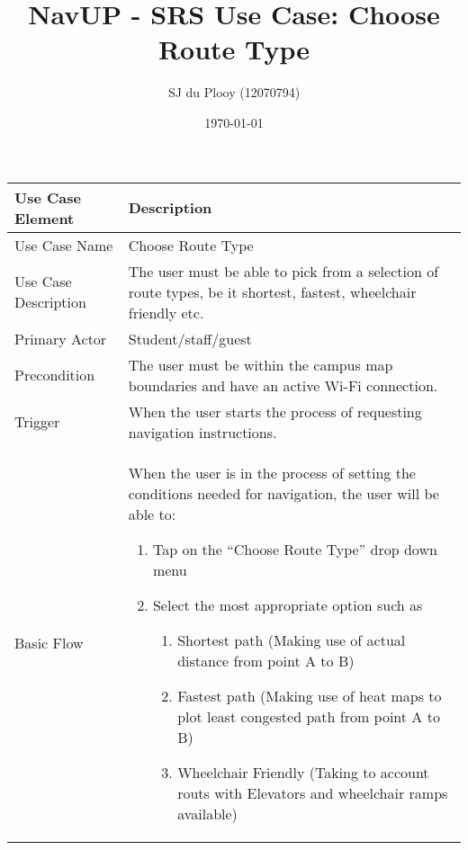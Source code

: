 \documentclass[12pt]{article}
\begin{document}
\title{NavUP - SRS Use Case: Choose Route Type}
\author{SJ du Plooy (12070794)}
\date{\today}
\maketitle


\begin{tabular}{|p{4cm}|p{10cm}|}
\hline

Use Case Element & Description \\
\hline

Use Case Name & 
Choose Route Type \\
\hline

Use Case Description & 
The user must be able to pick from a selection of route types, be it shortest, fastest, wheelchair friendly etc.   \\
\hline

Primary Actor & 
Student/staff/guest \\
\hline

Precondition & 
The user must be within the campus map boundaries and have an active Wi-Fi connection.   \\
\hline

Trigger & 
When the user starts the process of requesting navigation instructions.   \\
\hline

Basic Flow & 
When the user is in the process of setting the conditions needed for navigation, the user will be able to:
\begin{enumerate}
\item Tap on the “Choose Route Type” drop down menu
\item Select the most appropriate option such as
	\begin{enumerate}
	\item Shortest path (Making use of actual distance from point A to B)
	\item Fastest path (Making use of heat maps to plot least congested path from point A to B)
	\item Wheelchair Friendly (Taking to account routs with Elevators and wheelchair ramps available)
	\end{enumerate}
\end{enumerate} \\
\hline

\hline
\end{tabular}
\end{document}
